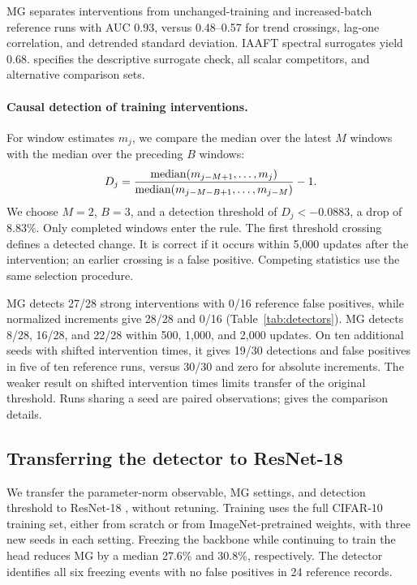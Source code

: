 {MG separates interventions from unchanged-training and increased-batch reference runs with AUC 0.93, versus 0.48--0.57 for trend crossings, lag-one correlation, and detrended standard deviation. IAAFT spectral surrogates yield 0.68.  specifies the descriptive surrogate check, all scalar competitors, and alternative comparison sets.

\paragraph{Causal detection of training interventions.}
For window estimates $m_j$, we compare the median over the latest $M$ windows with the median over the preceding $B$ windows:
\begin{equation}
D_j=\frac{\operatorname{median}(m_{j-M+1},\ldots,m_j)}
{\operatorname{median}(m_{j-M-B+1},\ldots,m_{j-M})}-1.
\label{eq:detector}
\end{equation}
We choose $M=2$, $B=3$, and a detection threshold of $D_j<-0.0883$, a drop of 8.83\%. Only completed windows enter the rule. The first threshold crossing defines a detected change. It is correct if it occurs within 5,000 updates after the intervention; an earlier crossing is a false positive. Competing statistics use the same selection procedure.

MG detects 27/28 strong interventions with 0/16 reference false positives, while normalized increments give 28/28 and 0/16 (Table~\ref{tab:detectors}). MG detects 8/28, 16/28, and 22/28 within 500, 1,000, and 2,000 updates. On ten additional seeds with shifted intervention times, it gives 19/30 detections and false positives in five of ten reference runs, versus 30/30 and zero for absolute increments. The weaker result on shifted intervention times limits transfer of the original threshold. Runs sharing a seed are paired observations;  gives the comparison details.

\begin{table}[t]
\centering\small
\caption{}
\label{tab:detectors}

\end{table}

\subsection{Transferring the detector to ResNet-18}
We transfer the parameter-norm observable, MG settings, and detection threshold to ResNet-18 \citep{he2016deep}, without retuning. Training uses the full CIFAR-10 training set, either from scratch or from ImageNet-pretrained weights, with three new seeds in each setting. Freezing the backbone while continuing to train the head reduces MG by a median 27.6\% and 30.8\%, respectively. The detector identifies all six freezing events with no false positives in 24 reference records.

}
